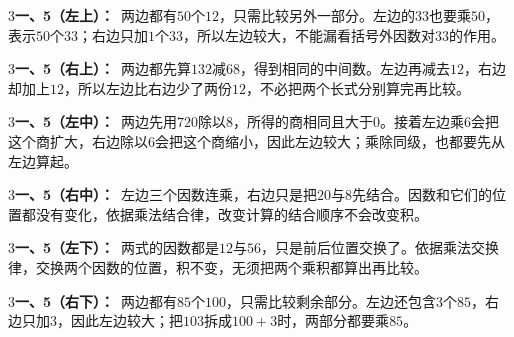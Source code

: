 \documentclass[multi=snippet,border={5bp 20bp 5bp 5bp}]{standalone}
\newenvironment{snippet}[3]{\begin{minipage}{#1bp}\color{answerred}\fontsize{#2}{#3}\selectfont\raggedright}{\end{minipage}}
\begin{document}
\begin{snippet}{505}{11.5}{14}\begin{multicols}{3}\raggedcolumns \textbf{一、5（左上）：}\ 两边都有\(50\)\allowbreak 个\(12\)\allowbreak ，只需比较另外一部分。左边的\(33\)\allowbreak 也要乘\(50\)\allowbreak ，表示\(50\)\allowbreak 个\(33\)\allowbreak ；右边只加\(1\)\allowbreak 个\(33\)\allowbreak ，所以左边较大，不能漏看括号外因数对\(33\)\allowbreak 的作用。\end{multicols}\end{snippet}
\begin{snippet}{505}{11.5}{14}\begin{multicols}{3}\raggedcolumns \textbf{一、5（右上）：}\ 两边都先算\(132\)\allowbreak 减\(68\)\allowbreak ，得到相同的中间数。左边再减去\(12\)\allowbreak ，右边却加上\(12\)\allowbreak ，所以左边比右边少了两份\(12\)\allowbreak ，不必把两个长式分别算完再比较。\end{multicols}\end{snippet}
\begin{snippet}{505}{11.5}{14}\begin{multicols}{3}\raggedcolumns \textbf{一、5（左中）：}\ 两边先用\(720\)\allowbreak 除以\(8\)\allowbreak ，所得的商相同且大于\(0\)\allowbreak 。接着左边乘\(6\)\allowbreak 会把这个商扩大，右边除以\(6\)\allowbreak 会把这个商缩小，因此左边较大；乘除同级，也都要先从左边算起。\end{multicols}\end{snippet}
\begin{snippet}{505}{11.5}{14}\begin{multicols}{3}\raggedcolumns \textbf{一、5（右中）：}\ 左边三个因数连乘，右边只是把\(20\)\allowbreak 与\(8\)\allowbreak 先结合。因数和它们的位置都没有变化，依据乘法结合律，改变计算的结合顺序不会改变积。\end{multicols}\end{snippet}
\begin{snippet}{505}{11.5}{14}\begin{multicols}{3}\raggedcolumns \textbf{一、5（左下）：}\ 两式的因数都是\(12\)\allowbreak 与\(56\)\allowbreak ，只是前后位置交换了。依据乘法交换律，交换两个因数的位置，积不变，无须把两个乘积都算出再比较。\end{multicols}\end{snippet}
\begin{snippet}{505}{11.5}{14}\begin{multicols}{3}\raggedcolumns \textbf{一、5（右下）：}\ 两边都有\(85\)\allowbreak 个\(100\)\allowbreak ，只需比较剩余部分。左边还包含\(3\)\allowbreak 个\(85\)\allowbreak ，右边只加\(3\)\allowbreak ，因此左边较大；把\(103\)\allowbreak 拆成\(100+3\)\allowbreak 时，两部分都要乘\(85\)\allowbreak 。\end{multicols}\end{snippet}
\end{document}
